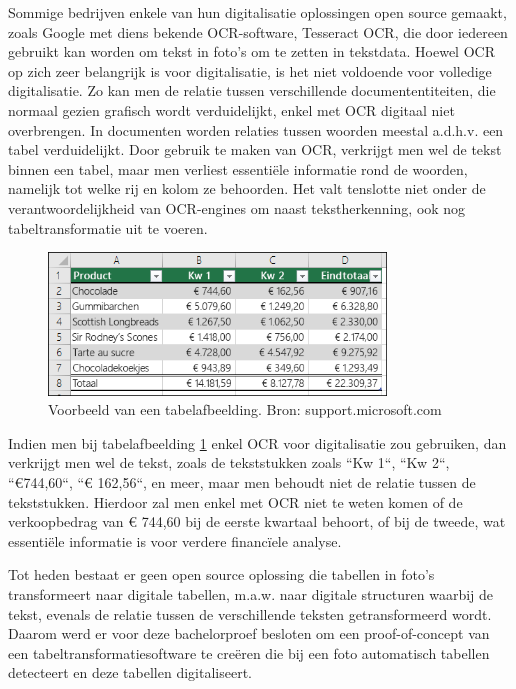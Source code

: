 Sommige bedrijven enkele van hun digitalisatie oplossingen open source gemaakt, zoals Google met diens bekende OCR-software, Tesseract OCR, die door iedereen gebruikt kan worden om tekst in foto’s om te zetten in tekstdata. Hoewel \Gls{OCR} op zich zeer belangrijk is voor digitalisatie, is het niet voldoende voor volledige digitalisatie. Zo kan men de relatie tussen verschillende documententiteiten, die normaal gezien grafisch wordt verduidelijkt, enkel met \Gls{OCR} digitaal niet overbrengen. In documenten worden relaties tussen woorden meestal a.d.h.v. een tabel verduidelijkt. Door gebruik te maken van \Gls{OCR}, verkrijgt men wel de tekst binnen een tabel, maar men verliest essentiële informatie rond de woorden, namelijk tot welke rij en kolom ze behoorden. Het valt tenslotte niet onder de verantwoordelijkheid van OCR-engines om naast tekstherkenning, ook nog tabeltransformatie uit te voeren.

\begin{figure}[h]
    \centering
    \includegraphics[width=0.8\textwidth]{img/tabel_verduidelijking_relaties_woorden.png}
    \caption{Voorbeeld van een tabelafbeelding. Bron: support.microsoft.com}
    \label{fig:tabel_verduidelijking_relaties_woorden}
\end{figure}

Indien men bij tabelafbeelding \ref{fig:tabel_verduidelijking_relaties_woorden} enkel \Gls{OCR} voor digitalisatie zou gebruiken, dan verkrijgt men wel de tekst, zoals de tekststukken zoals ``Kw 1``, ``Kw 2``, ``€744,60``, ``€ 162,56``, en meer, maar men behoudt niet de relatie tussen de tekststukken. Hierdoor zal men enkel met \Gls{OCR} niet te weten komen of de verkoopbedrag van € 744,60 bij de eerste kwartaal behoort, of bij de tweede, wat essentiële informatie is voor verdere financïele analyse.

Tot heden bestaat er geen open source oplossing die tabellen in foto's transformeert naar digitale tabellen, m.a.w. naar digitale structuren waarbij de tekst, evenals de relatie tussen de verschillende teksten getransformeerd wordt. Daarom werd er voor deze bachelorproef besloten om een proof-of-concept van een tabeltransformatiesoftware te creëren die bij een foto automatisch tabellen detecteert en deze tabellen digitaliseert.

